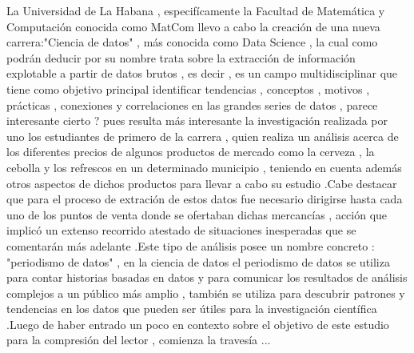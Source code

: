 \documentclass[twocolumn,12pt]{article}
\begin{document}
La Universidad de La Habana , especifícamente la Facultad de Matemática y Computación conocida como MatCom llevo a cabo la creación de una nueva carrera:"Ciencia de datos" , más conocida como Data Science , la cual como podrán deducir por su nombre trata sobre la extracción de información explotable a partir de datos brutos , es decir , es un campo multidisciplinar que tiene como objetivo principal identificar tendencias , conceptos , motivos , prácticas , conexiones y correlaciones en las grandes series de datos , parece interesante cierto ? pues resulta más interesante la investigación realizada por uno los estudiantes de primero de la carrera , quien realiza un análisis acerca de los diferentes precios de algunos productos de mercado como la cerveza , la cebolla y los refrescos en un determinado municipio , teniendo en cuenta además otros aspectos de dichos productos para llevar a cabo su estudio .Cabe destacar que para el proceso de extración de estos datos fue necesario dirigirse hasta cada uno de los puntos de venta donde se ofertaban dichas mercancías , acción que implicó un extenso recorrido atestado de situaciones inesperadas que se comentarán más adelante .Este tipo de análisis posee un nombre concreto : "periodismo de datos" , en la ciencia de datos el periodismo de datos se utiliza para contar historias basadas en datos y para comunicar los resultados de análisis complejos a un público más amplio , también se utiliza para descubrir patrones y tendencias en los datos que pueden ser útiles para la investigación científica .Luego de haber entrado un poco en contexto sobre el objetivo de este estudio para la compresión del lector , comienza la travesía ...\\
\end{document}

